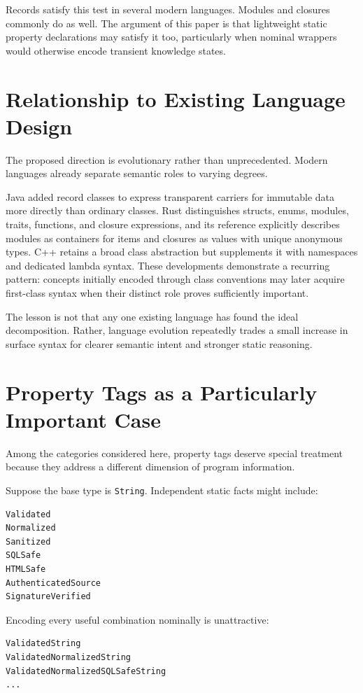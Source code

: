 \documentclass[11pt]{article}
\begin{document}
Records satisfy this test in several modern languages. Modules and closures commonly do as well. The argument of this paper is that lightweight static property declarations may satisfy it too, particularly when nominal wrappers would otherwise encode transient knowledge states.

\section{Relationship to Existing Language Design}

The proposed direction is evolutionary rather than unprecedented. Modern languages already separate semantic roles to varying degrees.

Java added record classes to express transparent carriers for immutable data more directly than ordinary classes. Rust distinguishes structs, enums, modules, traits, functions, and closure expressions, and its reference explicitly describes modules as containers for items and closures as values with unique anonymous types. C++ retains a broad class abstraction but supplements it with namespaces and dedicated lambda syntax. These developments demonstrate a recurring pattern: concepts initially encoded through class conventions may later acquire first-class syntax when their distinct role proves sufficiently important.

The lesson is not that any one existing language has found the ideal decomposition. Rather, language evolution repeatedly trades a small increase in surface syntax for clearer semantic intent and stronger static reasoning.

\section{Property Tags as a Particularly Important Case}

Among the categories considered here, property tags deserve special treatment because they address a different dimension of program information.

Suppose the base type is \texttt{String}. Independent static facts might include:

\begin{lstlisting}
Validated
Normalized
Sanitized
SQLSafe
HTMLSafe
AuthenticatedSource
SignatureVerified
\end{lstlisting}

Encoding every useful combination nominally is unattractive:

\begin{lstlisting}
ValidatedString
ValidatedNormalizedString
ValidatedNormalizedSQLSafeString
...
\end{lstlisting}
\end{document}
